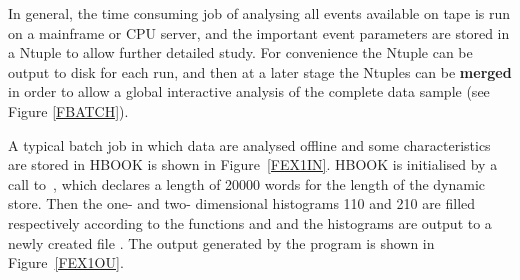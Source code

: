 In general, the time consuming job of
analysing all events available on tape is run on a mainframe or CPU 
server, and
the important event parameters are stored in a Ntuple
to allow further detailed study. For convenience the Ntuple
can be output to disk for each run, and then at a later stage the
Ntuples can be {\bf merged} in order to allow a global
interactive analysis of the complete data sample (see Figure \ref{FBATCH}).

\vspace*{\baselineskip}

A typical batch job in which data are analysed offline and
some characteristics are stored in HBOOK is shown in Figure~\ref{FEX1IN}.
HBOOK is initialised by a call to~, 
which declares a length of 20000 words for the
length of the  dynamic store. Then the one- and two-
dimensional histograms 110 and 210 are filled respectively
according to the functions  and 
and the histograms are output to a newly created file .
The output generated by the program is shown in Figure~\ref{FEX1OU}.

